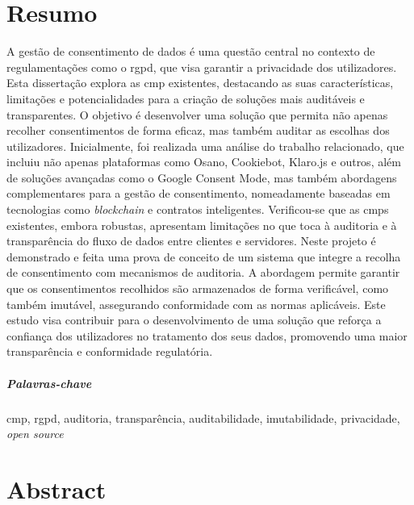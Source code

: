 \chapter*{Resumo}

A gestão de consentimento de dados é uma questão central no contexto de regulamentações como o \acrfull{rgpd}, que visa garantir a privacidade dos utilizadores. Esta dissertação explora as \acrfull{cmp} existentes, destacando as suas características, limitações e potencialidades para a criação de soluções mais auditáveis e transparentes. 
O objetivo é desenvolver uma solução que permita não apenas recolher consentimentos de forma eficaz, mas também auditar as escolhas dos utilizadores.
Inicialmente, foi realizada uma análise do trabalho relacionado, que incluiu não apenas plataformas como Osano, Cookiebot, Klaro.js e outros, além de soluções avançadas como o Google Consent Mode, mas também abordagens complementares para a gestão de consentimento, nomeadamente baseadas em tecnologias como \textit{blockchain} e contratos inteligentes. Verificou-se que as \acrshort{cmp}s existentes, embora robustas, apresentam limitações no que toca à auditoria e à transparência do fluxo de dados entre clientes e servidores.
Neste projeto é demonstrado e feita uma prova de conceito de um sistema que integre a recolha de consentimento com mecanismos de auditoria. A abordagem permite garantir que os consentimentos recolhidos são armazenados de forma verificável, como também imutável, assegurando conformidade com as normas aplicáveis. Este estudo visa contribuir para o desenvolvimento de uma solução que reforça a confiança dos utilizadores no tratamento dos seus dados, promovendo uma maior transparência e conformidade regulatória.

\paragraph{Palavras-chave} \acrshort{cmp}, \acrshort{rgpd}, auditoria, transparência, auditabilidade, imutabilidade, privacidade, \textit{open source}

\cleardoublepage

\chapter*{Abstract}


